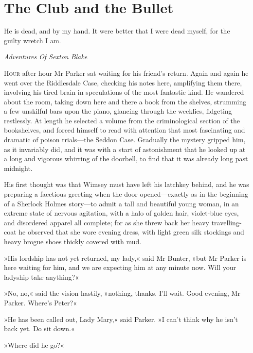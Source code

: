 


\chapter{The Club and the Bullet}

\epigraph{He is dead, and by my hand. It were better that I were dead myself, for the guilty wretch I am.}{\textit{Adventures Of Sexton Blake}}


\lettrine[lines=4]{H}{our} after hour Mr Parker sat waiting for his friend's return. Again and again he went over the Riddlesdale Case, checking his notes here, amplifying them there, involving his tired brain in speculations of the most fantastic kind. He wandered about the room, taking down here and there a book from the shelves, strumming a few unskilful bars upon the piano, glancing through the weeklies, fidgeting restlessly.  At length he selected a volume from the criminological section of the bookshelves, and forced himself to read with attention that most fascinating and dramatic of poison trials\allowbreak---\allowbreak the Seddon Case. Gradually the mystery gripped him, as it invariably did, and it was with a start of astonishment that he looked up at a long and vigorous whirring of the doorbell, to find that it was already long past midnight.

His first thought was that Wimsey must have left his latchkey behind, and he was preparing a facetious greeting when the door opened\allowbreak---\allowbreak exactly as in the beginning of a Sherlock Holmes story\allowbreak---\allowbreak to admit a tall and beautiful young woman, in an extreme state of nervous agitation, with a halo of golden hair, violet-blue eyes, and disordered apparel all complete; for as she threw back her heavy travelling-coat he observed that she wore evening dress, with light green silk stockings and heavy brogue shoes thickly covered with mud.

»His lordship has not yet returned, my lady,« said Mr Bunter, »but Mr  Parker is here waiting for him, and we are expecting him at any minute now. Will your ladyship take anything?«

»No, no,« said the vision hastily, »nothing, thanks. I'll wait. Good evening, Mr Parker. Where's Peter?«

»He has been called out, Lady Mary,« said Parker. »I can't think why he isn't back yet. Do sit down.«

»Where did he go?«

